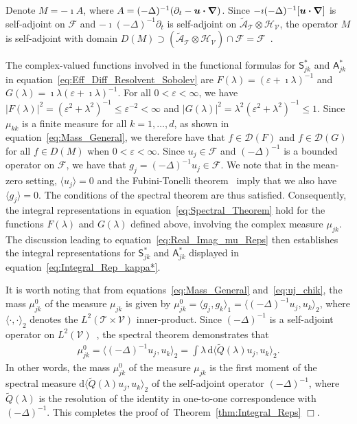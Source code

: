 \documentclass[leqno,onefignum,onetabnum]{siamltex1213}
\newcommand{\thmref}[1]{Theorem~\ref{#1}}
\renewcommand{\d}{\mathrm{d}}
\newcommand{\Tc}{\mathcal{T}}
\newcommand{\Vc}{\mathcal{V}}
\newcommand{\Sm}{\mathsf{S}}
\newcommand{\Am}{\mathsf{A}}
\newcommand{\Hs}{\mathscr{H}}
\newcommand{\As}{\mathscr{A}}
\newcommand{\Ds}{\mathscr{D}}
\newcommand{\Fs}{\mathscr{F}}
\newcommand\bnabla{\mbox{\boldmath${\nabla}$}}
\providecommand\bcdot{\boldsymbol{\cdot}}
\newcommand{\vecu}{\boldsymbol{u}}
\begin{document}
Denote $M=-\imath A$, where $A=(-\Delta)^{-1}(\partial_t-\vecu\bcdot\bnabla)$. Since
$-\imath(-\Delta)^{-1}[\vecu\bcdot\bnabla]$ is self-adjoint on $\Fs$ and 
$-\imath(-\Delta)^{-1}\partial_t$ is self-adjoint on $\tilde{\As}_{\Tc}\otimes\Hs_{\Vc}$, the
operator $M$ is self-adjoint with domain
$D(M)\supset(\tilde{\As}_{\Tc}\otimes\Hs_{\Vc})\cap\Fs=\Fs$~\cite{Stone:64}. 




The
complex-valued functions involved in the functional formulas for
$\Sm^*_{jk}$ and $\Am^*_{jk}$ in
equation~\eqref{eq:Eff_Diff_Resolvent_Sobolev} are $F(\lambda)=(\varepsilon+\imath\lambda)^{-1}$
and $G(\lambda)=\imath\lambda(\varepsilon+\imath\lambda)^{-1}$. For all $0<\varepsilon<\infty$, 
we have $|F(\lambda)|^2=(\varepsilon^2+\lambda^2)^{-1}\leq\varepsilon^{-2}<\infty$ and 
$|G(\lambda)|^2=\lambda^2(\varepsilon^2+\lambda^2)^{-1}\leq 1$. Since $\mu_{kk}$ is a finite measure
for all $k=1,\ldots,d$, as shown in equation~\eqref{eq:Mass_General}, we
therefore have 
that $f\in\Ds(F)$ and $f\in\Ds(G)$ for all $f\in D(M)$ when $0<\varepsilon<\infty$. Since $u_j\in\Fs$ and $(-\Delta)^{-1}$ is a bounded operator on $\Fs$, we have that 
$g_j=(-\Delta)^{-1}u_j\in\Fs$. We note that in the mean-zero setting,
$\langle u_j\rangle=0$ and the Fubini-Tonelli theorem~\cite{Folland:99:RealAnalysis} 
imply that we also have $\langle g_j\rangle=0$. The conditions of the spectral
theorem are thus satisfied. Consequently, the integral representations in
equation~\eqref{eq:Spectral_Theorem} hold for the functions $F(\lambda)$ and
$G(\lambda)$ defined above, involving the complex measure $\mu_{jk}$. The
discussion leading to equation~\eqref{eq:Real_Imag_mu_Reps} then
establishes the integral representations for $\Sm^*_{jk}$ and
$\Am^*_{jk}$ displayed in equation~\eqref{eq:Integral_Rep_kappa*}.



It is worth noting that from
equations~\eqref{eq:Mass_General} and~\eqref{eq:uj_chik}, the mass
$\mu_{jk}^0$ of the measure $\mu_{jk}$ is given by
$\mu_{jk}^0=\langle g_j,g_k\rangle_1=\langle(-\Delta)^{-1}u_j,u_k\rangle_2$, where $\langle\cdot,\cdot\rangle_2$ denotes
the $L^2(\Tc\times\Vc)$ inner-product. Since
$(-\Delta)^{-1}$ is a self-adjoint operator on
$L^2(\Vc)$~\cite{Stakgold:BVP:2000}, the spectral theorem demonstrates
that  
%
\begin{align}\label{eq:Laplacian_moment}
  \mu_{jk}^0=\langle(-\Delta)^{-1}u_j,u_k\rangle_2=\int\lambda\,\d\langle\tilde{Q}(\lambda)u_j,u_k\rangle_2.
\end{align}
%
In other words, the mass $\mu_{jk}^0$ of the measure $\mu_{jk}$ is the first moment
of the spectral measure $\d\langle\tilde{Q}(\lambda)u_j,u_k\rangle_2$ of the
self-adjoint operator $(-\Delta)^{-1}$, where $\tilde{Q}(\lambda)$ is the
resolution of the identity in one-to-one correspondence with
$(-\Delta)^{-1}$. This completes the proof of~\thmref{thm:Integral_Reps} $\Box$. 
\end{document}
